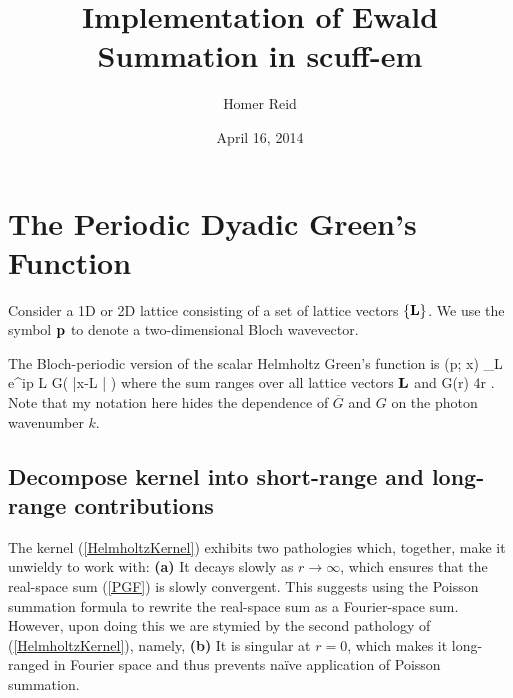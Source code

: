 \documentclass[letterpaper]{article}
\title {Implementation of Ewald Summation in {\sc scuff-em}}
\author {Homer Reid}
\date {April 16, 2014}
\newcommand{\GB}{\overline{G}}
\begin{document}
\pagestyle{myheadings}
\maketitle

\tableofcontents

\newpage

\section{The Periodic Dyadic Green's Function}

Consider a 1D or 2D lattice consisting of a set of
lattice vectors $\{\mathbf{L}\}$.
We use the symbol $\mathbf{p}$ to denote a two-dimensional
Bloch wavevector.

The Bloch-periodic version of the scalar Helmholtz Green's function is
{ \GB(\vb p; \vb x) 
  \equiv 
  \sum_{\vb L} e^{i\vb p \cdot \vb L} G\Big( \big |\vb x-\vb L \big| \Big)
}
where the sum ranges over all lattice vectors $\mathbf{L}$ and
{ G(r)
  \equiv {} { 4\pi r} .
}
Note that my notation here hides the dependence of $\GB$ and $G$ 
on the photon wavenumber $k$.

\subsection{Decompose kernel into short-range and long-range contributions}

The kernel (\ref{HelmholtzKernel}) exhibits two pathologies
which, together, make it unwieldy to work with:
\textbf{(a)} It decays slowly as $r\to\infty$, which 
ensures that the real-space sum (\ref{PGF}) is slowly 
convergent. This suggests using the Poisson summation
formula to rewrite the real-space sum as a Fourier-space
sum.
However, upon doing this we are stymied by the 
second pathology of (\ref{HelmholtzKernel}), namely,
\textbf{(b)} It is singular at $r=0$, which makes it 
long-ranged in Fourier space and thus prevents na\"ive 
application of Poisson summation.
\end{document}
